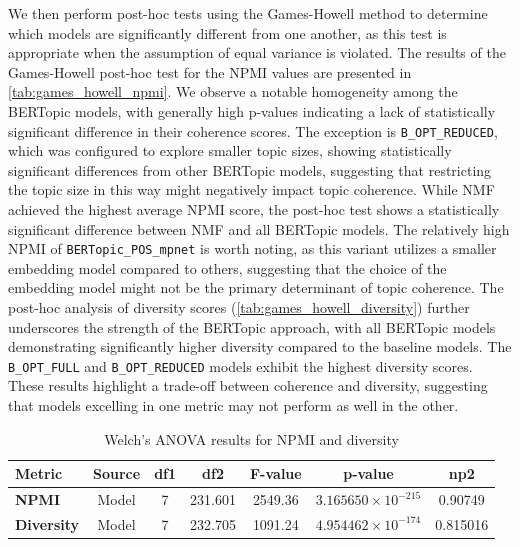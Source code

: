 We then perform post-hoc tests using the Games-Howell method to determine which models are significantly different from one another, as this test is appropriate when the assumption of equal variance is violated. The results of the Games-Howell post-hoc test for the NPMI values are presented in \cref{tab:games_howell_npmi}. We observe a notable homogeneity among the BERTopic models, with generally high p-values indicating a lack of statistically significant difference in their coherence scores. The exception is \texttt{B\_OPT\_REDUCED}, which was configured to explore smaller topic sizes, showing statistically significant differences from other BERTopic models, suggesting that restricting the topic size in this way might negatively impact topic coherence. While NMF achieved the highest average NPMI score, the post-hoc test shows a statistically significant difference between NMF and all BERTopic models. The relatively high NPMI of \texttt{BERTopic\_POS\_mpnet} is worth noting, as this variant utilizes a smaller embedding model compared to others, suggesting that the choice of the embedding model might not be the primary determinant of topic coherence. The post-hoc analysis of diversity scores (\cref{tab:games_howell_diversity}) further underscores the strength of the BERTopic approach, with all BERTopic models demonstrating significantly higher diversity compared to the baseline models. The \texttt{B\_OPT\_FULL} and \texttt{B\_OPT\_REDUCED} models exhibit the highest diversity scores. These results highlight a trade-off between coherence and diversity, suggesting that models excelling in one metric may not perform as well in the other.

\begin{table}[ht]
    \centering
    \caption{Welch's ANOVA results for NPMI and diversity}
    \label{tab:welch_anova}
    \begin{tabular}{lcccccc}
        \toprule
        \textbf{Metric}    & \textbf{Source} & \textbf{df1} & \textbf{df2} & \textbf{F-value} & \textbf{p-value}            & \textbf{np2} \\
        \midrule
        \textbf{NPMI}      & Model           & 7            & 231.601      & 2549.36          & $3.165650 \times 10^{-215}$ & 0.90749      \\
        \textbf{Diversity} & Model           & 7            & 232.705      & 1091.24          & $4.954462 \times 10^{-174}$ & 0.815016     \\
        \bottomrule
    \end{tabular}
\end{table}

